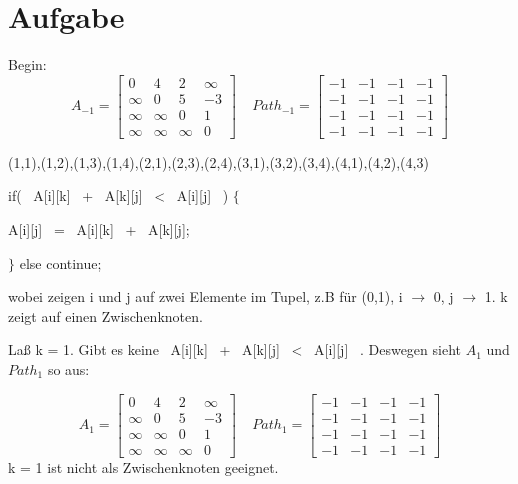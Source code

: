 \documentclass[fleqn]{article}
\begin{document}
\pagestyle{main}
\section{Aufgabe}


Begin:
$$A_{-1}=\begin{bmatrix}
    0 & 4 & 2 & \infty \\
    \infty & 0 & 5 & -3 \\
    \infty & \infty & 0 & 1 \\
    \infty & \infty & \infty & 0
\end{bmatrix} \ \ \ \ \
Path_{-1}=\begin{bmatrix}
    -1 & -1 & -1 & -1 \\
    -1 & -1 & -1 & -1 \\
    -1 & -1 & -1 & -1 \\
    -1 & -1 & -1 & -1
\end{bmatrix}
$$  

(1,1),(1,2),(1,3),(1,4),(2,1),(2,3),(2,4),(3,1),(3,2),(3,4),(4,1),(4,2),(4,3)  

if( \ A[i][k] \ + \ A[k][j] \ < \ A[i][j] \ ) $\{$

\qquad A[i][j] \ = \ A[i][k] \ + \ A[k][j];

$\}$
else continue;  

wobei zeigen i und j auf zwei Elemente im Tupel, z.B für (0,1), i $\rightarrow$ 0, j $\rightarrow$ 1. 
k zeigt auf einen Zwischenknoten.  

Laß k = 1. Gibt es keine \ A[i][k] \ + \ A[k][j] \ < \ A[i][j] \ . Deswegen sieht $A_{1}$ und $Path_{1}$ so aus:

$$A_{1}=\begin{bmatrix}
    0 & 4 & 2 & \infty \\
    \infty & 0 & 5 & -3 \\
    \infty & \infty & 0 & 1 \\
    \infty & \infty & \infty & 0
\end{bmatrix} \ \ \ \ \
Path_{1}=\begin{bmatrix}
    -1 & -1 & -1 & -1 \\
    -1 & -1 & -1 & -1 \\
    -1 & -1 & -1 & -1 \\
    -1 & -1 & -1 & -1
\end{bmatrix}
$$
k = 1 ist nicht als Zwischenknoten geeignet.  
\\  
\end{document}
